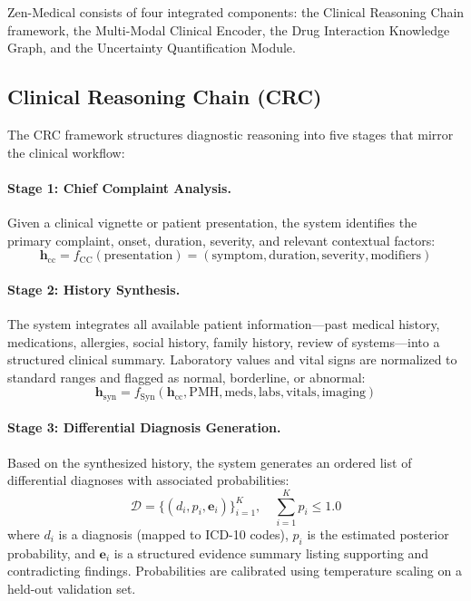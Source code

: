 \documentclass[11pt,a4paper]{article}
\begin{document}
Zen-Medical consists of four integrated components: the Clinical Reasoning Chain framework, the Multi-Modal Clinical Encoder, the Drug Interaction Knowledge Graph, and the Uncertainty Quantification Module.

\subsection{Clinical Reasoning Chain (CRC)}
\label{sec:crc}

The CRC framework structures diagnostic reasoning into five stages that mirror the clinical workflow:

\paragraph{Stage 1: Chief Complaint Analysis.} Given a clinical vignette or patient presentation, the system identifies the primary complaint, onset, duration, severity, and relevant contextual factors:
\begin{equation}
    \bm{h}_{\text{cc}} = f_{\text{CC}}(\text{presentation}) = (\text{symptom}, \text{duration}, \text{severity}, \text{modifiers})
\end{equation}

\paragraph{Stage 2: History Synthesis.} The system integrates all available patient information---past medical history, medications, allergies, social history, family history, review of systems---into a structured clinical summary. Laboratory values and vital signs are normalized to standard ranges and flagged as normal, borderline, or abnormal:
\begin{equation}
    \bm{h}_{\text{syn}} = f_{\text{Syn}}(\bm{h}_{\text{cc}}, \text{PMH}, \text{meds}, \text{labs}, \text{vitals}, \text{imaging})
\end{equation}

\paragraph{Stage 3: Differential Diagnosis Generation.} Based on the synthesized history, the system generates an ordered list of differential diagnoses with associated probabilities:
\begin{equation}
    \mathcal{D} = \{(d_i, p_i, \bm{e}_i)\}_{i=1}^{K}, \quad \sum_{i=1}^{K} p_i \leq 1.0
\end{equation}
where $d_i$ is a diagnosis (mapped to ICD-10 codes), $p_i$ is the estimated posterior probability, and $\bm{e}_i$ is a structured evidence summary listing supporting and contradicting findings. Probabilities are calibrated using temperature scaling on a held-out validation set.
\end{document}
